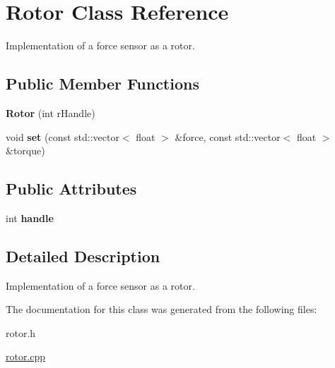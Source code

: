 \hypertarget{classRotor}{}\section{Rotor Class Reference}
\label{classRotor}


Implementation of a force sensor as a rotor.  


\subsection*{Public Member Functions}
\begin{DoxyCompactItemize}
\item 
{\bfseries Rotor} (int r\+Handle)\hypertarget{classRotor_ab1ad46cf401db508602fb136f09094c2}{}\label{classRotor_ab1ad46cf401db508602fb136f09094c2}

\item 
void {\bfseries set} (const std\+::vector$<$ float $>$ \&force, const std\+::vector$<$ float $>$ \&torque)\hypertarget{classRotor_aa961955180593d6249b3c35730b29cfb}{}\label{classRotor_aa961955180593d6249b3c35730b29cfb}

\end{DoxyCompactItemize}
\subsection*{Public Attributes}
\begin{DoxyCompactItemize}
\item 
int {\bfseries handle}\hypertarget{classRotor_ae6da9102b10f4759201a62117f6b2b6e}{}\label{classRotor_ae6da9102b10f4759201a62117f6b2b6e}

\end{DoxyCompactItemize}


\subsection{Detailed Description}
Implementation of a force sensor as a rotor. 

The documentation for this class was generated from the following files\+:\begin{DoxyCompactItemize}
\item 
rotor.\+h\item 
\hyperlink{rotor_8cpp}{rotor.\+cpp}\end{DoxyCompactItemize}
